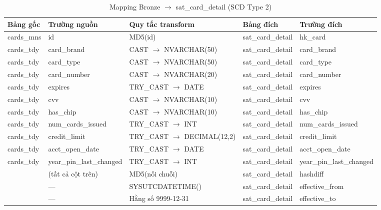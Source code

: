 \begin{table}[H]
\centering
\footnotesize

\begin{tabular}{lllll}
\hline
\textbf{Bảng gốc} & \textbf{Trường nguồn} & \textbf{Quy tắc transform} & \textbf{Bảng đích} & \textbf{Trường đích} \\
\hline
cards\_mns & id                    & MD5(id)                   & sat\_card\_detail & hk\_card                \\
cards\_tdy & card\_brand           & CAST $\rightarrow$ NVARCHAR(50)       & sat\_card\_detail & card\_brand             \\
cards\_tdy & card\_type            & CAST $\rightarrow$ NVARCHAR(50)       & sat\_card\_detail & card\_type              \\
cards\_tdy & card\_number          & CAST $\rightarrow$ NVARCHAR(20)       & sat\_card\_detail & card\_number            \\
cards\_tdy & expires               & TRY\_CAST $\rightarrow$ DATE          & sat\_card\_detail & expires                 \\
cards\_tdy & cvv                   & CAST $\rightarrow$ NVARCHAR(10)       & sat\_card\_detail & cvv                     \\
cards\_tdy & has\_chip             & CAST $\rightarrow$ NVARCHAR(10)       & sat\_card\_detail & has\_chip               \\
cards\_tdy & num\_cards\_issued    & TRY\_CAST $\rightarrow$ INT           & sat\_card\_detail & num\_cards\_issued      \\
cards\_tdy & credit\_limit         & TRY\_CAST $\rightarrow$ DECIMAL(12,2) & sat\_card\_detail & credit\_limit           \\
cards\_tdy & acct\_open\_date      & TRY\_CAST $\rightarrow$ DATE          & sat\_card\_detail & acct\_open\_date        \\
cards\_tdy & year\_pin\_last\_changed & TRY\_CAST $\rightarrow$ INT        & sat\_card\_detail & year\_pin\_last\_changed \\
           & (tất cả cột trên)    & MD5(nối chuỗi)            & sat\_card\_detail & hashdiff                \\
           & —                    & SYSUTCDATETIME()          & sat\_card\_detail & effective\_from         \\
           & —                    & Hằng số 9999-12-31        & sat\_card\_detail & effective\_to           \\
\hline
\end{tabular}
\caption{Mapping Bronze $\rightarrow$ sat\_card\_detail (SCD Type 2)}
\end{table}

